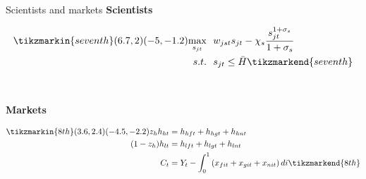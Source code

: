 \documentclass[11pt,aspectratio=169]{beamer}
\begin{document}
\begin{frame}{ Scientists and markets}
\textbf{Scientists}\\
\vspace{2mm}
\begin{minipage}[t!]{1\textwidth}
	\begin{align*}
	\tikzmarkin{seventh}(6.7,2)(-5,-1.2)
\underset{s_{jt}}{\max}\ \ & w_{jst}s_{jt}-\chi_s \frac{s_{jt}^{1+\sigma_s}}{1+\sigma_s}\\
s.t. \ \ & s_{jt}\leq \bar{H}	\tikzmarkend{seventh}
	\end{align*}
\end{minipage}
\\
\pause

\vspace{9mm}
\textbf{Markets}\\ \vspace{1mm}
\begin{minipage}[t!]{1\textwidth}
	\begin{align*}
	\tikzmarkin{8th}(3.6,2.4)(-4.5,-2.2)
z_h h_{ht}&=h_{hft}+h_{hgt}+h_{hnt}\\
(1-z_h) h_{lt}&=h_{lft}+h_{lgt}+h_{lnt}\\
C_t&=Y_t-\int_{0}^{1}\left(x_{fit}+x_{git}+x_{nit}\right)di
	\tikzmarkend{8th}
	\end{align*}
\end{minipage}
\end{frame}
\end{document}
